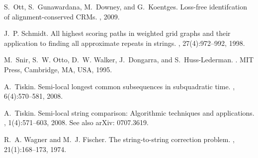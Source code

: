 \documentclass{IOS-Book-Article}     \usepackage{amsmath}
\theoremstyle{plain}
\theoremstyle{definition}
\begin{document}
\begin{thebibliography}{10}
S.~Ott, S.~Gunawardana, M.~Downey, and G.~Koentges.
\newblock Loss-free identifcation of alignment-conserved {CRMs}.
, 2009.

J.~P. Schmidt.
\newblock All highest scoring paths in weighted grid graphs and their
  application to finding all approximate repeats in strings.
, 27(4):972--992, 1998.

M.~Snir, S.~W. Otto, D.~W. Walker, J.~Dongarra, and S.~Huss-Lederman.
.
\newblock MIT Press, Cambridge, MA, USA, 1995.

A.~Tiskin.
\newblock Semi-local longest common subsequences in subquadratic time.
, 6(4):570--581, 2008.

A.~Tiskin.
\newblock Semi-local string comparison: Algorithmic techniques and
  applications.
, 1(4):571--603, 2008.
\newblock See also arXiv: 0707.3619.

R.~A. Wagner and M.~J. Fischer.
\newblock The string-to-string correction problem.
, 21(1):168--173, 1974.

\end{thebibliography}
\end{document}

